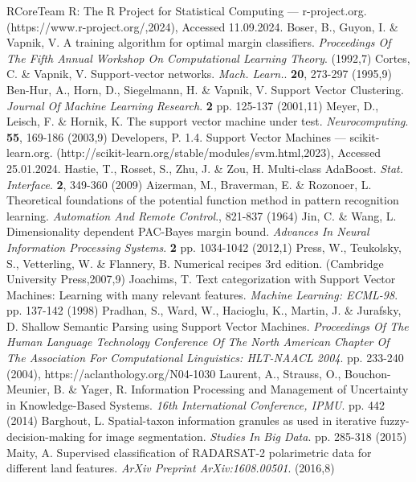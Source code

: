 \documentclass[sn-mathphys-num]{sn-jnl}%
\begin{document}
\begin{thebibliography}{000}
RCoreTeam R: The R Project for Statistical Computing — r-project.org. (https://www.r-project.org/,2024), Accessed 11.09.2024.
Boser, B., Guyon, I. \& Vapnik, V. A training algorithm for optimal margin classifiers. {\em Proceedings Of The Fifth Annual Workshop On Computational Learning Theory}. (1992,7)
Cortes, C. \& Vapnik, V. Support-vector networks. {\em Mach. Learn.}. \textbf{20}, 273-297 (1995,9)
Ben-Hur, A., Horn, D., Siegelmann, H. \& Vapnik, V. Support Vector Clustering. {\em Journal Of Machine Learning Research}. \textbf{2} pp. 125-137 (2001,11)
Meyer, D., Leisch, F. \& Hornik, K. The support vector machine under test. {\em Neurocomputing}. \textbf{55}, 169-186 (2003,9)
Developers, P. 1.4. Support Vector Machines — scikit-learn.org. (http://scikit-learn.org/stable/modules/svm.html,2023), Accessed 25.01.2024.
Hastie, T., Rosset, S., Zhu, J. \& Zou, H. Multi-class AdaBoost. {\em Stat. Interface}. \textbf{2}, 349-360 (2009)
Aizerman, M., Braverman, E. \& Rozonoer, L. Theoretical foundations of the potential function method in pattern recognition learning. {\em Automation And Remote Control}., 821-837 (1964)
Jin, C. \& Wang, L. Dimensionality dependent PAC-Bayes margin bound. {\em Advances In Neural Information Processing Systems}. \textbf{2} pp. 1034-1042 (2012,1)
Press, W., Teukolsky, S., Vetterling, W. \& Flannery, B. Numerical recipes 3rd edition. (Cambridge University Press,2007,9)
Joachims, T. Text categorization with Support Vector Machines: Learning with many relevant features. {\em Machine Learning: ECML-98}. pp. 137-142 (1998)
Pradhan, S., Ward, W., Hacioglu, K., Martin, J. \& Jurafsky, D. Shallow Semantic Parsing using Support Vector Machines. {\em Proceedings Of The Human Language Technology Conference Of The North American Chapter Of The Association For Computational Linguistics: HLT-NAACL 2004}. pp. 233-240 (2004), https://aclanthology.org/N04-1030
Laurent, A., Strauss, O., Bouchon-Meunier, B. \& Yager, R. Information Processing and Management of Uncertainty in Knowledge-Based Systems. {\em 16th International Conference, IPMU}. pp. 442 (2014)
Barghout, L. Spatial-taxon information granules as used in iterative fuzzy-decision-making for image segmentation. {\em Studies In Big Data}. pp. 285-318 (2015)
Maity, A. Supervised classification of RADARSAT-2 polarimetric data for different land features. {\em ArXiv Preprint ArXiv:1608.00501}. (2016,8)

\end{thebibliography}
\end{document}
